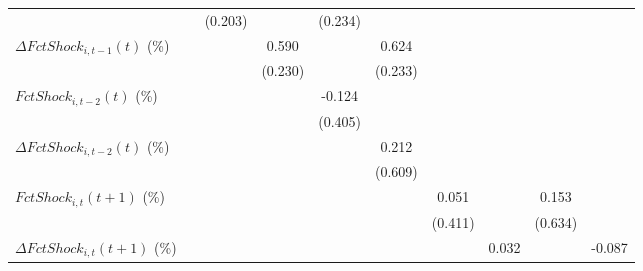 {\begin{tabular}{l*{9}{c}}
                    &                     &     (0.203)         &                     &     (0.234)         &                     &                     &                     &                     &                     \\
\addlinespace
$ \Delta FctShock_{i,t-1}(t)$ (\%)&                     &                     &       0.590\sym{**} &                     &       0.624\sym{**} &                     &                     &                     &                     \\
                    &                     &                     &     (0.230)         &                     &     (0.233)         &                     &                     &                     &                     \\
\addlinespace
$ FctShock_{i,t-2}(t)$ (\%)&                     &                     &                     &      -0.124         &                     &                     &                     &                     &                     \\
                    &                     &                     &                     &     (0.405)         &                     &                     &                     &                     &                     \\
\addlinespace
$ \Delta FctShock_{i,t-2}(t)$ (\%)&                     &                     &                     &                     &       0.212         &                     &                     &                     &                     \\
                    &                     &                     &                     &                     &     (0.609)         &                     &                     &                     &                     \\
\addlinespace
$ FctShock_{i,t}(t+1)$ (\%)&                     &                     &                     &                     &                     &       0.051         &                     &       0.153         &                     \\
                    &                     &                     &                     &                     &                     &     (0.411)         &                     &     (0.634)         &                     \\
\addlinespace
$ \Delta FctShock_{i,t}(t+1)$ (\%)&                     &                     &                     &                     &                     &                     &       0.032         &                     &      -0.087         \\

\end{tabular}}
